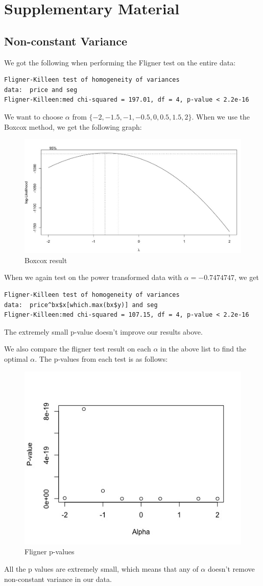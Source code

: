 \documentclass[paper=letter, fontsize=11pt]{scrartcl}
\begin{document}
\section{Supplementary Material}

\subsection{Non-constant Variance}
\label{app:variance}

We got the following when performing the Fligner test on the entire data:
\begin{lstlisting}
Fligner-Killeen test of homogeneity of variances
data:  price and seg
Fligner-Killeen:med chi-squared = 197.01, df = 4, p-value < 2.2e-16
\end{lstlisting}
We want to choose $\alpha$ from $\{-2,-1.5,-1,-0.5,0,0.5,1.5,2\}$.
When we use the Boxcox method, we get the following graph:
\begin{figure}[H]
    \centering
    \includegraphics[width=0.5\linewidth]{Image/boxcox.jpeg}
    \caption{Boxcox result}
\end{figure}
When we again test on the power transformed data with $\alpha=-0.7474747$, we get
\begin{lstlisting}
Fligner-Killeen test of homogeneity of variances
data:  price^bx$x[which.max(bx$y)] and seg
Fligner-Killeen:med chi-squared = 107.15, df = 4, p-value < 2.2e-16
\end{lstlisting}
The extremely small p-value doesn't improve our results above.

We also compare the fligner test result on each $\alpha$ in the above list to find the optimal $\alpha$. The p-values from each test is as follows:
\begin{figure}[H]
    \centering
    \includegraphics[width=0.5\linewidth]{Image/fligner-pval.jpeg}
    \caption{Fligner p-values}
\end{figure}
All the p values are extremely small, which means that any of $\alpha$ doesn't remove non-constant variance in our data.
\end{document}
